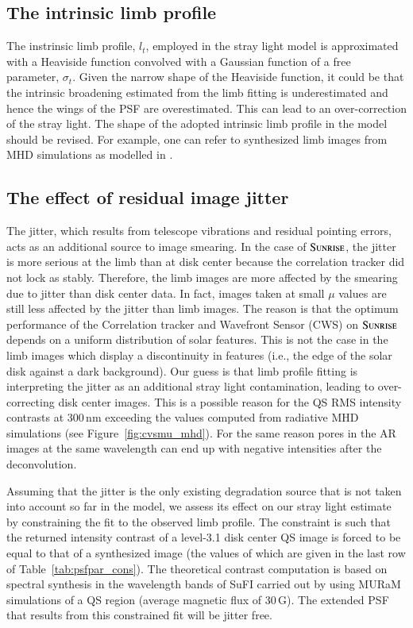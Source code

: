 \documentclass[goettingen, gauss, print]{thesis}
\begin{document}
\subsection{The intrinsic limb profile}
The instrinsic limb profile, $l_t$, employed in the stray light model is approximated with a Heaviside function convolved with a Gaussian function of a free parameter, $\sigma_t$.
Given the narrow shape of the Heaviside function, it could be that the intrinsic broadening estimated from the limb fitting is underestimated and hence the wings of the PSF are overestimated. This can lead to an over-correction of the stray light. The shape of the adopted intrinsic limb profile in the model should be revised. For example, one can refer to synthesized limb images from MHD simulations as modelled in \cite{shelyag_spectro-polarimetric_2015}.

\subsection{The effect of residual image jitter}
\label{jitter}

The jitter, which results from telescope vibrations and residual pointing errors, acts as an additional source to image smearing. In the case of $\textsc{Sunrise}$, the jitter is more serious at the limb than at disk center because the correlation tracker did not lock as stably. Therefore, the limb images are more affected by the smearing due to jitter than disk center data. In fact, images taken at small $\mu$ values are still less affected by the jitter than limb images. The reason is that the optimum performance of the Correlation tracker and Wavefront Sensor (CWS) on $\textsc{Sunrise}$ depends on a uniform distribution of solar features. This is not the case in the limb images which display a discontinuity in features (i.e., the edge of the solar disk against a dark background). Our guess is that limb profile fitting is interpreting the jitter as an additional stray light contamination, leading to over-correcting disk center images. This is a possible reason for the QS RMS intensity contrasts at 300\,nm exceeding the values computed from radiative MHD simulations (see Figure~\ref{fig:cvsmu_mhd}). For the same reason pores in the AR images at the same wavelength can end up with negative intensities after the deconvolution.

Assuming that the jitter is the only existing degradation source that is not taken into account so far in the model, we assess its effect on our stray light estimate by constraining the fit to the observed limb profile. The constraint is such that the returned intensity contrast of a level-3.1 disk center QS image is forced to be equal to that of a synthesized image (the values of which are given in the last row of Table~\ref{tab:psfpar_cons}). The theoretical contrast computation is based on spectral synthesis in the wavelength bands of SuFI carried out by \cite{riethmuller_comparison_2014} using MURaM simulations of a QS region (average magnetic flux of 30\,G). The extended PSF that results from this constrained fit will be jitter free. 
\end{document}
